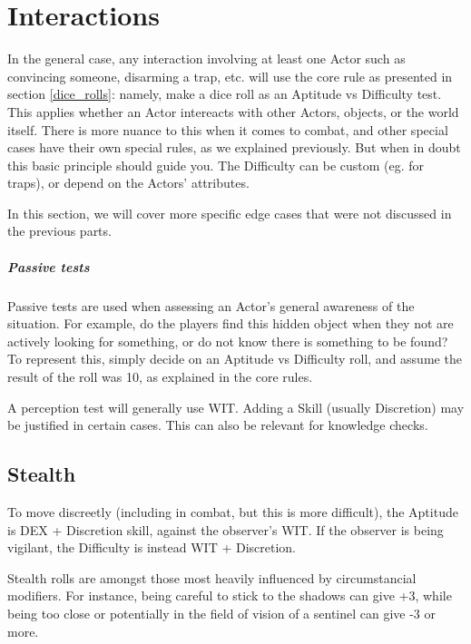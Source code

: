 
\chapter{Interactions}

In the general case, any interaction involving at least one Actor such as convincing someone, disarming a trap, etc. will use the core rule as presented in section \ref{dice_rolls}: namely, make a dice roll as an Aptitude vs Difficulty test. This applies whether an Actor intereacts with other Actors, objects, or the world itself. There is more nuance to this when it comes to combat, and other special cases have their own special rules, as we explained previously. But when in doubt this basic principle should guide you. The Difficulty can be custom (eg. for traps), or depend on the Actors' attributes. 

In this section, we will cover more specific edge cases that were not discussed in the previous parts.

\paragraph{Passive tests} 

Passive tests are used when assessing an Actor's general awareness of the situation. For example, do the players find this hidden object when they not are actively looking for something, or do not know there is something to be found? To represent this, simply decide on an Aptitude vs Difficulty roll, and assume the result of the roll was 10, as explained in the core rules.

A perception test will generally use WIT. Adding a Skill (usually Discretion) may be justified in certain cases. This can also be relevant for knowledge checks.

\section{Stealth} 

To move discreetly (including in combat, but this is more difficult), the Aptitude is DEX + Discretion skill, against the observer's WIT. If the observer is being vigilant, the Difficulty is instead WIT + Discretion.

Stealth rolls are amongst those most heavily influenced by circumstancial modifiers. For instance, being careful to stick to the shadows can give +3, while being too close or potentially in the field of vision of a sentinel can give -3 or more.	


